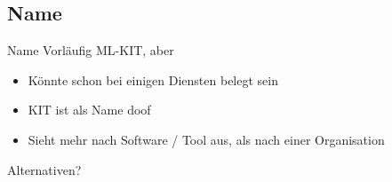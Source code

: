 \subsection{Name}

\begin{frame}{Name}
    Vorläufig ML-KIT, aber
    \begin{itemize}
        \item Könnte schon bei einigen Diensten belegt sein
        \item KIT ist als Name doof
        \item Sieht mehr nach Software / Tool aus, als nach einer Organisation
    \end{itemize}

    Alternativen?
\end{frame}
